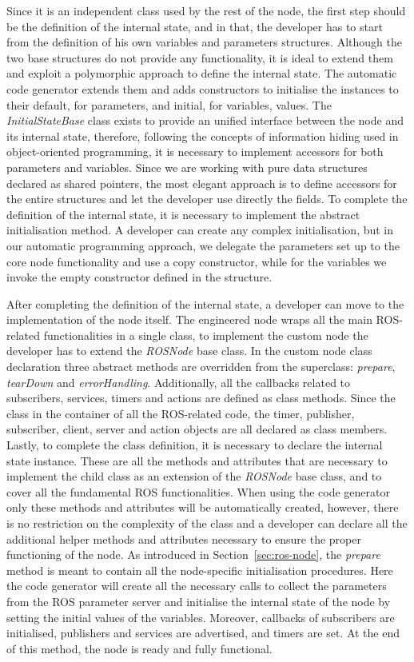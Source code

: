 Since it is an independent class used by the rest of the node, the first step should be the definition of the internal state, and in that, the developer has to start from the definition of his own variables and parameters structures. Although the two base structures do not provide any functionality, it is ideal to extend them and exploit a polymorphic approach to define the internal state. The automatic code generator extends them and adds constructors to initialise the instances to their default, for parameters, and initial, for variables, values. The \textit{InitialStateBase} class exists to provide an unified interface between the node and its internal state, therefore, following the concepts of information hiding used in object-oriented programming, it is necessary to implement accessors for both parameters and variables. Since we are working with pure data structures declared as shared pointers, the most elegant approach is to define accessors for the entire structures and let the developer use directly the fields. To complete the definition of the internal state, it is necessary to implement the abstract initialisation method. A developer can create any complex initialisation, but in our automatic programming approach, we delegate the parameters set up to the core node functionality and use a copy constructor, while for the variables we invoke the empty constructor defined in the structure.

After completing the definition of the internal state, a developer can move to the implementation of the node itself. The engineered node wraps all the main ROS-related functionalities in a single class, to implement the custom node the developer has to extend the \textit{ROSNode} base class. In the custom node class declaration three abstract methods are overridden from the superclass: \textit{prepare}, \textit{tearDown} and \textit{errorHandling}. Additionally, all the callbacks related to subscribers, services, timers and actions are defined as class methods. Since the class in the container of all the ROS-related code, the timer, publisher, subscriber, client, server and action objects are all declared as class members. Lastly, to complete the class definition, it is necessary to declare the internal state instance. These are all the methods and attributes that are necessary to implement the child class as an extension of the \textit{ROSNode} base class, and to cover all the fundamental ROS functionalities. When using the code generator only these methods and attributes will be automatically created, however, there is no restriction on the complexity of the class and a developer can declare all the additional helper methods and attributes necessary to ensure the proper functioning of the node. As introduced in Section~\ref{sec:ros-node}, the \textit{prepare} method is meant to contain all the node-specific initialisation procedures. Here the code generator will create all the necessary calls to collect the parameters from the ROS parameter server and initialise the internal state of the node by setting the initial values of the variables. Moreover, callbacks of subscribers are initialised, publishers and services are advertised, and timers are set. At the end of this method, the node is ready and fully functional.



